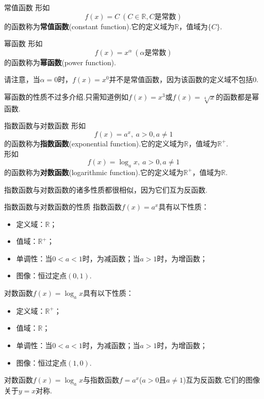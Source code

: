 \documentclass[lang=cn, zihao=5]{elegantbook}
\begin{document}
\begin{definition}{常值函数}
    形如$$f(x)=C \ (C \in \mathbb{R}, C\textit{是常数})$$
    的函数称为\textbf{常值函数}(constant function).它的定义域为$\mathbb{R}$，值域为$\{ C \}$.
\end{definition}

\begin{definition}{幂函数}
    形如$$f(x)=x^{\alpha} \ (\alpha \text{是常数})$$
    的函数称为\textbf{幂函数}(power function).
\end{definition}
\begin{remark}
	请注意，当$\alpha =0$时，$f(x)=x^0$并不是常值函数，因为该函数的定义域不包括$0$.
\end{remark}

幂函数的性质不过多介绍.只需知道例如$f(x)=x^3$或$f(x)=\sqrt[4]{x}$的函数都是幂函数.

\begin{definition}{指数函数与对数函数}
	形如$$f(x)=a^x, \ a>0 , a\neq 1$$
    的函数称为\textbf{指数函数}(exponential function).它的定义域为$\mathbb{R}$，值域为$\mathbb{R}^{+}$. \\
    形如$$f(x)=\log_{a}{x}, \ a>0,a \neq 1$$
    的函数称为\textbf{对数函数}(logarithmic function).它的定义域为$\mathbb{R}^{+}$，值域为$\mathbb{R}$.
\end{definition}

指数函数与对数函数的诸多性质都很相似，因为它们互为反函数.

\begin{proposition}{指数函数与对数函数的性质}
    指数函数$f(x)=a^x$具有以下性质：
    \begin{itemize}
        \item 定义域：$\mathbb{R}$；
        \item 值域：$\mathbb{R}^+$；
        \item 单调性：当$0<a<1$时，为减函数；当$a>1$时，为增函数；
        \item 图像：恒过定点$(0,1)$.
    \end{itemize}
    对数函数$f(x)=\log_{a}{x}$具有以下性质：
    \begin{itemize}
        \item 定义域：$\mathbb{R}^{+}$；
        \item 值域：$\mathbb{R}$；
        \item 单调性：当$0<a<1$时，为减函数；当$a>1$时，为增函数；
        \item 图像：恒过定点$(1,0)$.
    \end{itemize}
    对数函数$f(x)=\log_{a}{x}$与指数函数$f=a^{x}$($a>0$且$a \neq 1$)互为反函数.它们的图像关于$y=x$对称.
\end{proposition}
\end{document}
